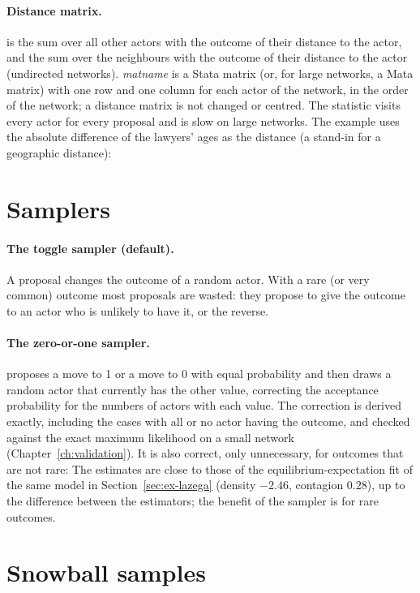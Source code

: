 \paragraph{Distance matrix.}  is the sum over all other actors with the outcome of their distance to the actor, and  the sum over the neighbours with the outcome of their distance to the actor (undirected networks). \emph{matname} is a Stata matrix (or, for large networks, a Mata matrix) with one row and one column for each actor of the network, in the order of the network; a distance matrix is not changed or centred. The statistic visits every actor for every proposal and is slow on large networks. The example uses the absolute difference of the lawyers' ages as the distance (a stand-in for a geographic distance):

\section{Samplers}\label{sec:samplers}

\paragraph{The toggle sampler (default).} A proposal changes the outcome of a random actor. With a rare (or very common) outcome most proposals are wasted: they propose to give the outcome to an actor who is unlikely to have it, or the reverse.

\paragraph{The zero-or-one sampler.}  proposes a move to 1 or a move to 0 with equal probability and then draws a random actor that currently has the other value, correcting the acceptance probability for the numbers of actors with each value. The correction is derived exactly, including the cases with all or no actor having the outcome, and checked against the exact maximum likelihood on a small network (Chapter~\ref{ch:validation}). It is also correct, only unnecessary, for outcomes that are not rare:
The estimates are close to those of the equilibrium-expectation fit of the same model in Section~\ref{sec:ex-lazega} (density $-2.46$, contagion $0.28$), up to the difference between the estimators; the benefit of the sampler is for rare outcomes.

\section{Snowball samples}\label{sec:snowball}


